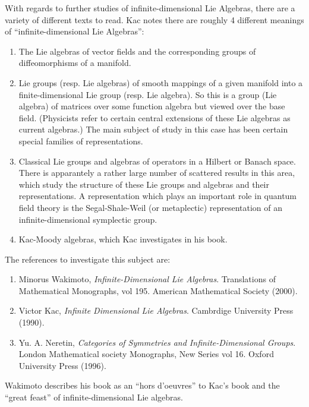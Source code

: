 With regards to further studies of infinite-dimensional Lie
Algebras, there are a variety of different texts to read. Kac
notes there are roughly 4 different meanings of
``infinite-dimensional Lie Algebras'':
\begin{enumerate}
\item The Lie algebras of vector fields and the corresponding
groups of diffeomorphisms of a manifold.
\item Lie groups (resp. Lie algebras) of smooth mappings of a
given manifold into a finite-dimensional Lie group (resp. Lie
algebra). So this is a group (Lie algebra) of matrices over some
function algebra but viewed over the base field. (Physicists
refer to certain central extensions of these Lie algebras as
current algebras.) The main subject of study in this case has
been certain special families of representations.
\item Classical Lie groups and algebras of operators in a
Hilbert or Banach space. There is apparantely a rather large
number of scattered results in this area, which study the
structure of these Lie groups and algebras and their
representations. A representation which plays an important role
in quantum field theory is the Segal-Shale-Weil (or metaplectic)
representation of an infinite-dimensional symplectic group. %
\item Kac-Moody algebras, which Kac investigates in his book.
\end{enumerate}
The references to investigate this subject are:
\begin{enumerate}
\item Minorus Wakimoto, \emph{Infinite-Dimensional Lie
  Algebras}. Translations of Mathematical Monographs, vol
  195. American Mathematical Society (2000). 
\item Victor Kac, \emph{Infinite Dimensional Lie
  Algebras}. Cambrdige University Press (1990). 
\item Yu. A. Neretin, \emph{Categories of Symmetries and
  Infinite-Dimensional Groups}. London Mathematical society
  Monographs, New Series vol 16. Oxford University Press (1996).
\end{enumerate}
\noindent{}Wakimoto describes his book as an ``hors d'oeuvres''
to Kac's book and the ``great feast'' of infinite-dimensional Lie
algebras. 
